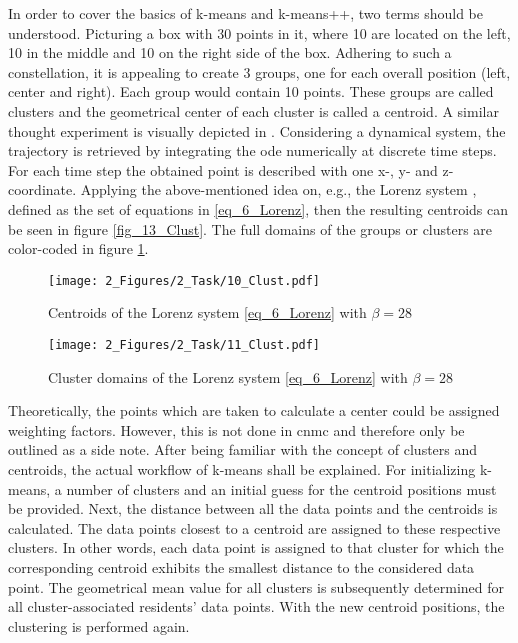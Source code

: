 In order to 
cover the basics of k-means and k-means++, two terms 
should be understood.
Picturing a box with 30 points in it, where 10 are located on the left,  10
in the middle and 10 on the right side of the box. Adhering to such a 
constellation, it is appealing to create 3 groups, one for 
each overall position (left, center and right). Each group would 
contain 10 points. These groups are called clusters and the 
geometrical center of each cluster is called a centroid. 
A similar thought experiment is visually depicted in \cite{Sergei_Visual}.
Considering a dynamical system, the trajectory is retrieved by integrating the \gls{ode} numerically at discrete time steps. 
For each time step the obtained point is described with one x-, y- and z-coordinate. 
Applying the above-mentioned idea on, e.g., the Lorenz system \cite{lorenz1963deterministic}, defined as the set of equations in \eqref{eq_6_Lorenz}, then the resulting centroids can be seen in figure \ref{fig_13_Clust}.
The full domains of the groups or clusters are color-coded in figure \ref{fig_14_Clust}.\newline

\begin{figure}[!h]
    \begin{minipage}[h]{0.47\textwidth}
        \centering
        \texttt{[image: 2\_Figures/2\_Task/10\_Clust.pdf]}
        \caption{Centroids of the Lorenz system  \eqref{eq_6_Lorenz} with $\beta =28$}
        \label{fig_13_Clust}    
    \end{minipage}
    \hfill
    \begin{minipage}{0.47\textwidth}
        \centering
        \texttt{[image: 2\_Figures/2\_Task/11\_Clust.pdf]}
        \caption{Cluster domains of the Lorenz system \eqref{eq_6_Lorenz} with $\beta =28$}
        \label{fig_14_Clust}    
    \end{minipage}
\end{figure}


Theoretically, 
the points which are taken to calculate a center could be assigned 
weighting factors. However, this is not done in \gls{cnmc} and therefore only 
be outlined as a side note. After being familiar with the concept of 
clusters and centroids, the actual workflow of k-means shall be explained.
For initializing 
k-means, a number of clusters and an initial guess for the centroid 
positions must be provided. Next, the distance between all the data 
points and the centroids is calculated. The data points closest to a 
centroid are assigned to these respective clusters. In other words, each data point is assigned to that cluster for which 
the corresponding centroid exhibits the smallest distance 
to the considered data point. 
The geometrical mean value for all clusters is subsequently determined for all cluster-associated residents' data points. With the 
new centroid positions, the clustering is 
performed again. \newline 

